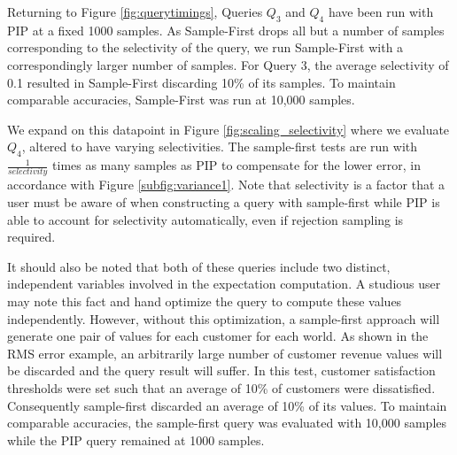 Returning to Figure \ref{fig:querytimings}, Queries $Q_3$ and $Q_4$ have been run with PIP at a fixed 1000 samples.  As Sample-First drops all but a number of samples corresponding to the selectivity of the query, we run Sample-First with a correspondingly larger number of samples.  For Query 3, the average selectivity of 0.1 resulted in Sample-First discarding 10\% of its samples.  To maintain comparable accuracies, Sample-First was run at 10,000 samples.  

We expand on this datapoint in Figure \ref{fig:scaling_selectivity} where we evaluate $Q_4$, altered to have varying selectivities.  The sample-first tests are run with $\frac{1}{selectivity}$ times as many samples as PIP to compensate for the lower error, in accordance with Figure \ref{subfig:variance1}.  Note that selectivity is a factor that a user must be aware of when constructing a query with sample-first while PIP is able to account for selectivity automatically, even if rejection sampling is required.

It should also be noted that both of these queries include two distinct, independent variables involved in the expectation computation.  A studious user may note this fact and hand optimize the query to compute these values independently.  However, without this optimization, a sample-first approach will generate one pair of values for each customer for each world.  As shown in the RMS error example, an arbitrarily large number of customer revenue values will be discarded and the query result will suffer.  In this test, customer satisfaction thresholds were set such that an average of 10\% of customers were dissatisfied.  Consequently sample-first discarded an average of 10\% of its values.  To maintain comparable accuracies, the sample-first query was evaluated with 10,000 samples while the PIP query remained at 1000 samples. 

%
%
